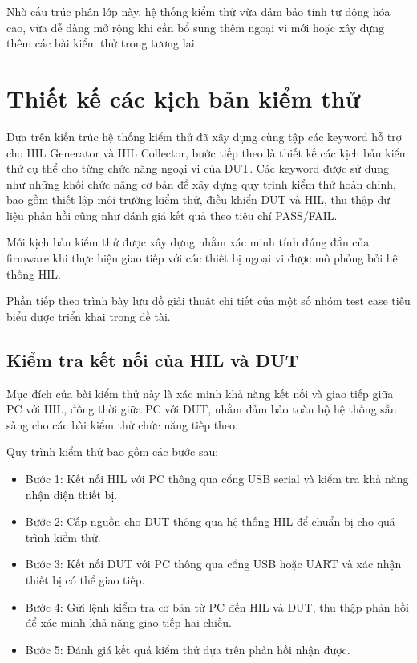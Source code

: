 Nhờ cấu trúc phân lớp này, hệ thống kiểm thử vừa đảm bảo tính tự động hóa cao, vừa dễ dàng mở rộng khi cần bổ sung thêm ngoại vi mới hoặc xây dựng thêm các bài kiểm thử trong tương lai.


\section{Thiết kế các kịch bản kiểm thử}

Dựa trên kiến trúc hệ thống kiểm thử đã xây dựng cùng tập các keyword hỗ trợ cho HIL Generator và HIL Collector, bước tiếp theo là thiết kế các kịch bản kiểm thử cụ thể cho từng chức năng ngoại vi của DUT. Các keyword được sử dụng như những khối chức năng cơ bản để xây dựng quy trình kiểm thử hoàn chỉnh, bao gồm thiết lập môi trường kiểm thử, điều khiển DUT và HIL, thu thập dữ liệu phản hồi cũng như đánh giá kết quả theo tiêu chí PASS/FAIL.

Mỗi kịch bản kiểm thử được xây dựng nhằm xác minh tính đúng đắn của firmware khi thực hiện giao tiếp với các thiết bị ngoại vi được mô phỏng bởi hệ thống HIL.

Phần tiếp theo trình bày lưu đồ giải thuật chi tiết của một số nhóm test case tiêu biểu được triển khai trong đề tài.

\subsection{Kiểm tra kết nối của HIL và DUT}

Mục đích của bài kiểm thử này là xác minh khả năng kết nối và giao tiếp giữa PC với HIL, đồng thời giữa PC với DUT, nhằm đảm bảo toàn bộ hệ thống sẵn sàng cho các bài kiểm thử chức năng tiếp theo.

Quy trình kiểm thử bao gồm các bước sau:

\begin{itemize}
    \item Bước 1: Kết nối HIL với PC thông qua cổng USB serial và kiểm tra khả năng nhận diện thiết bị.
    \item Bước 2: Cấp nguồn cho DUT thông qua hệ thống HIL để chuẩn bị cho quá trình kiểm thử.
    \item Bước 3: Kết nối DUT với PC thông qua cổng USB hoặc UART và xác nhận thiết bị có thể giao tiếp.
    \item Bước 4: Gửi lệnh kiểm tra cơ bản từ PC đến HIL và DUT, thu thập phản hồi để xác minh khả năng giao tiếp hai chiều.
    \item Bước 5: Đánh giá kết quả kiểm thử dựa trên phản hồi nhận được.
\end{itemize}

